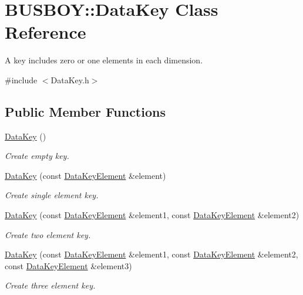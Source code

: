 \hypertarget{classBUSBOY_1_1DataKey}{
\section{BUSBOY::DataKey Class Reference}
\label{classBUSBOY_1_1DataKey}
}


A key includes zero or one elements in each dimension.  


{\ttfamily \#include $<$DataKey.h$>$}\subsection*{Public Member Functions}
\begin{DoxyCompactItemize}
\item 
\hyperlink{classBUSBOY_1_1DataKey_af7bf81081ee759a6a1b5da3e5adee371}{DataKey} ()
\begin{DoxyCompactList}\small\item\em Create empty key. \item\end{DoxyCompactList}\item 
\hyperlink{classBUSBOY_1_1DataKey_a302a8f510e3875a76c3cf4b4a0a0cab4}{DataKey} (const \hyperlink{classBUSBOY_1_1DataKeyElement}{DataKeyElement} \&element)
\begin{DoxyCompactList}\small\item\em Create single element key. \item\end{DoxyCompactList}\item 
\hyperlink{classBUSBOY_1_1DataKey_a727da01dad9831cbc8b8c4a7b9c2c7ed}{DataKey} (const \hyperlink{classBUSBOY_1_1DataKeyElement}{DataKeyElement} \&element1, const \hyperlink{classBUSBOY_1_1DataKeyElement}{DataKeyElement} \&element2)
\begin{DoxyCompactList}\small\item\em Create two element key. \item\end{DoxyCompactList}\item 
\hyperlink{classBUSBOY_1_1DataKey_a66ee54044cf3f0e1a2b65a9f1a97da8e}{DataKey} (const \hyperlink{classBUSBOY_1_1DataKeyElement}{DataKeyElement} \&element1, const \hyperlink{classBUSBOY_1_1DataKeyElement}{DataKeyElement} \&element2, const \hyperlink{classBUSBOY_1_1DataKeyElement}{DataKeyElement} \&element3)
\begin{DoxyCompactList}\small\item\em Create three element key. \item\end{DoxyCompactList}\item 

\end{DoxyCompactItemize}
